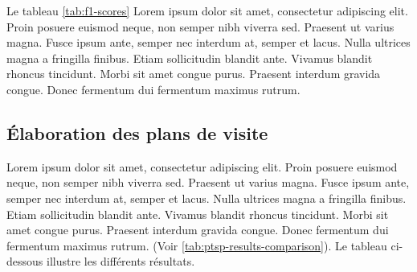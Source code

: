 Le tableau \ref{tab:f1-scores} Lorem ipsum dolor sit amet, consectetur adipiscing elit. Proin posuere euismod neque, non semper nibh viverra sed. Praesent ut varius magna. Fusce ipsum ante, semper nec interdum at, semper et lacus. Nulla ultrices magna a fringilla finibus. Etiam sollicitudin blandit ante. Vivamus blandit rhoncus tincidunt. Morbi sit amet congue purus. Praesent interdum gravida congue. Donec fermentum dui fermentum maximus rutrum.

\subsection{Élaboration des plans de visite}
Lorem ipsum dolor sit amet, consectetur adipiscing elit. Proin posuere euismod neque, non semper nibh viverra sed. Praesent ut varius magna. Fusce ipsum ante, semper nec interdum at, semper et lacus. Nulla ultrices magna a fringilla finibus. Etiam sollicitudin blandit ante. Vivamus blandit rhoncus tincidunt. Morbi sit amet congue purus. Praesent interdum gravida congue. Donec fermentum dui fermentum maximus rutrum. (Voir \ref{tab:ptsp-results-comparison}). Le tableau ci-dessous illustre les différents résultats.


